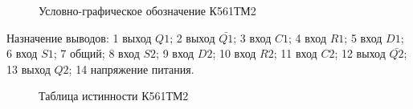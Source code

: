 \begin{figure}[ht]
  
  \caption{Условно-графическое обозначение К561ТМ2}
  \label{img:k561tm2}
\end{figure}

Назначение выводов: 1 \longndash выход $Q1$; 2 \longndash выход $\bar{Q1}$; 3 \longndash вход $C1$; 4 \longndash вход $R1$; 5 \longndash вход $D1$; 6 \longndash вход $S1$; 7 \longndash общий; 8 \longndash вход $S2$; 9 \longndash вход $D2$; 10 \longndash вход $R2$; 11 \longndash вход $C2$; 12 \longndash выход $\bar{Q2}$; 13 \longndash выход $Q2$; 14 \longndash напряжение питания.

\begin{figure}[ht]
  
  \caption{Таблица истинности К561ТМ2}
  \label{img:truthtable}
\end{figure}

